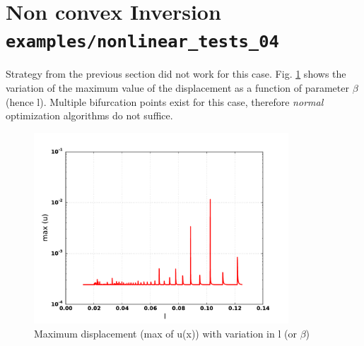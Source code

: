 \documentclass[%
notitlepage,
]{revtex4-1}
\newcommand{\be}{\ensuremath{{\beta}}\xspace}
\begin{document}
\section{Non convex Inversion \texttt{examples/nonlinear\_tests\_04}}
Strategy from the previous section did not work for this case. Fig. \ref{fig:nonconvex:inverse} shows the variation of the maximum value of the displacement as a function of parameter \be (hence l). Multiple bifurcation points exist for this case, therefore \textit{normal} optimization algorithms do not suffice.
\begin{figure}[!h]
	\includegraphics[width=0.85\textwidth]{figures/nonlinear_tests_04/max_u.pdf}
    \caption{Maximum displacement (max of u(x)) with variation in l (or \be)}
    \label{fig:nonconvex:inverse}
\end{figure}
\end{document}
